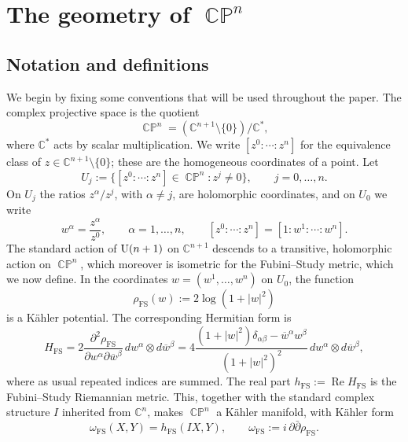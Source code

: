 \documentclass[11pt]{article}
\theoremstyle{plain}
\numberwithin{equation}{section}
\theoremstyle{definition}
\renewcommand{\Re}{\operatorname{Re}}
\def \C{\mathbb{C}}
\def \tp{\textup}
\def \FS{\mathrm{FS}}
\DeclareMathOperator{\CP}{\mathbb{CP}}
\begin{document}
\clearpage

\section{The geometry of \texorpdfstring{$\CP^n$}{CPn}}

\subsection{Notation and definitions}

We begin by fixing some conventions that will be used
throughout the paper.  The complex projective space is the quotient
\[
    \CP^n=(\C^{n+1}\setminus\{0\})/\C^*,
\]
where $\C^*$ acts by scalar multiplication.  We write
$[z^0:\cdots:z^n]$ for the equivalence class of
$z\in\C^{n+1}\setminus\{0\}$; these are the homogeneous coordinates of a
point.  Let
\[
    U_j:=\{[z^0:\cdots:z^n]\in\CP^n:z^j\neq0\}, \qquad j=0,\dots, n.
\]
On $U_j$ the ratios $z^\alpha/z^j$, with $\alpha\neq j$, are holomorphic
coordinates, and on $U_0$ we write
\begin{equation}
    \label{eq:AffineCoordinatesCPn}
    w^\alpha=\frac{z^\alpha}{z^0},\qquad \alpha=1,\ldots,n,
    \qquad
    [z^0:\cdots:z^n]=[1:w^1:\cdots:w^n].
\end{equation}
The standard action of $\tp{U}(n+1)$ on $\C^{n+1}$ descends to
a transitive, holomorphic action on $\CP^n$, which moreover is isometric for the
Fubini--Study metric, which we now define.  In the coordinates $w=(w^1,\ldots,w^n)$ on $U_0$, the
function
\begin{equation}
    \label{eq:FubiniStudyPotential}
    \rho_\FS(w):=2\log(1+|w|^2)
\end{equation}
is a K\"ahler potential.  The corresponding Hermitian
form is
\begin{equation}
    \label{eq:FubiniStudyCoordinates}
    H_\FS
    =2\frac{\partial^2\rho_\FS}
        {\partial w^\alpha\partial\overline w^\beta}
      \,dw^\alpha\otimes d\overline w^\beta
    =4\frac{(1+|w|^2)\delta_{\alpha\beta}
        -\overline w^\alpha w^\beta}
        {(1+|w|^2)^2}
      \,dw^\alpha\otimes d\overline w^\beta,
\end{equation}
where as usual repeated indices  are summed.
The real part $h_\FS:=\Re H_\FS$ is the Fubini--Study Riemannian metric.
This, together with the standard complex structure $I$ inherited from $\C^n$,  makes $\CP^n$ a
K\"ahler manifold, with K\"ahler form 
\begin{equation}
    \label{eq:kahler}
    \omega_\FS(X,Y) =h_\FS(I X,Y),
    \qquad
    \omega_\FS:=i\,\partial\bar\partial\rho_\FS.
\end{equation}
\end{document}
